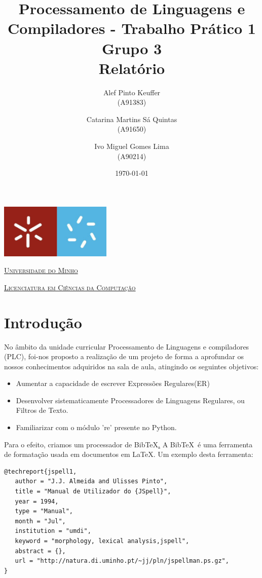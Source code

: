 \documentclass[11pt,a4paper]{report}
\title{Processamento de Linguagens e Compiladores - Trabalho Prático 1\\
       \textbf{Grupo 3}\\ Relatório
       } %
\author{Alef Pinto Keuffer\\ (A91383)\and Catarina Martins Sá Quintas\\ (A91650)\and  Ivo Miguel Gomes Lima \\(A90214)
       } %
\date{\today} %
\begin{document}
	\begin{minipage}{0.9\linewidth}
        \centering
		\includegraphics[width=0.4\textwidth]{um.jpeg}\par\vspace{1cm}
                \href{https://www.uminho.pt/PT}
		{\scshape\LARGE Universidade do Minho} \par
		\vspace{0.6cm}
                \href{https://lcc.di.uminho.pt}
		{\scshape\Large Licenciatura em Ciências da Computação} \par
		\maketitle
	\end{minipage}

\tableofcontents %

\chapter{Introdução}

No âmbito da unidade curricular Processamento de Linguagens e compiladores (PLC),
foi-nos proposto a realização de um projeto de forma a aprofundar os nossos
conhecimentos adquiridos na sala de aula, atingindo os seguintes objetivos:

\begin{itemize}
    \item Aumentar a capacidade de escrever Expressões Regulares(ER)
    \item Desenvolver sistematicamente Processadores de Linguagens Regulares, ou Filtros de Texto.
    \item Familiarizar com o módulo 're' presente no Python.
\end{itemize}
  

Para o efeito, criamos um  processador de Bib\TeX \href{http://www.bibtex.org/}. 
A Bib\TeX \ é uma ferramenta de formatação usada em documentos em La\TeX.
Um exemplo desta ferramenta: 
\begin{lstlisting}
@techreport{jspell1,
   author = "J.J. Almeida and Ulisses Pinto",
   title = "Manual de Utilizador do {JSpell}",
   year = 1994,
   type = "Manual",
   month = "Jul",
   institution = "umdi",
   keyword = "morphology, lexical analysis,jspell",
   abstract = {},
   url = "http://natura.di.uminho.pt/~jj/pln/jspellman.ps.gz",
}

\end{lstlisting}
\end{document}
